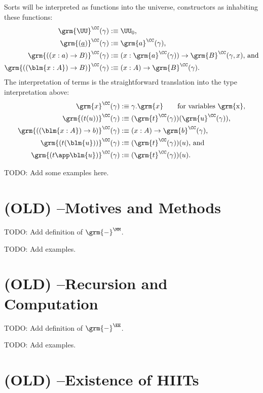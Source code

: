 \begin{defn}
Sorts will be interpreted as functions into the universe, constructors as inhabiting
these functions:
\begin{align*}
\grm{\UU}^\CC(\gamma) 			&:\equiv \UU_0 \text{,} \\
\grm{(\underline{a})}^\CC(\gamma)	&:\equiv \grm{a}^\CC(\gamma) \text{,} \\
\grm{((x : a) \to B)}^\CC(\gamma)	&:\equiv (x : \grm{a}^\CC(\gamma)) \to \grm{B}^\CC(\gamma, x) \text{, and} \\ %
\grm{((\blm{x : A}) \to B)}^\CC(\gamma) &:\equiv (x : A) \to \grm{B}^\CC(\gamma) \text{.}
\end{align*}
The interpretation of terms is the straightforward translation into the type interpretation
above:
\begin{align*}
\grm{x}^\CC(\gamma) 			&:\equiv \gamma.\grm{x} \qquad \text{for variables \grm{x},} \\
\grm{(t(u))}^\CC(\gamma)		&:\equiv (\grm{t}^\CC(\gamma))(\grm{u}^\CC(\gamma)) \text{,} \\
\grm{((\blm{x : A}) \to b)}^\CC(\gamma)	&:\equiv (x : A) \to \grm{b}^\CC(\gamma) \text{,} \\
\grm{(t(\blm{u}))}^\CC(\gamma)		&:\equiv (\grm{t}^\CC(\gamma))(u) \text{, and} \\
\grm{(t \app \blm{u})}^\CC(\gamma)	&:\equiv (\grm{t}^\CC(\gamma))(u) \text{.}
\end{align*}

\end{defn}

TODO: Add some examples here.

\section{(OLD) --Motives and Methods}

TODO: Add definition of $\grm{-}^\MM$.

TODO: Add examples.

\section{(OLD) --Recursion and Computation}

TODO: Add definition of $\grm{-}^\EE$.

TODO: Add examples.

\section{(OLD) --Existence of HIITs}

